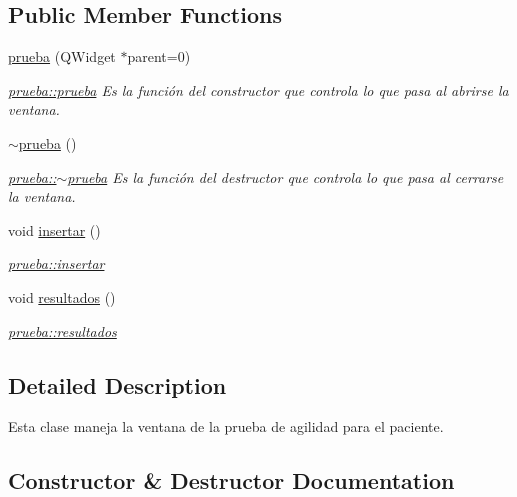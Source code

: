 \subsection*{Public Member Functions}
\begin{DoxyCompactItemize}
\item 
\hyperlink{classprueba_a24f54c7bdd250ae7c191204b6640e76a}{prueba} (Q\+Widget $\ast$parent=0)
\begin{DoxyCompactList}\small\item\em \hyperlink{classprueba_a24f54c7bdd250ae7c191204b6640e76a}{prueba\+::prueba} Es la función del constructor que controla lo que pasa al abrirse la ventana. \end{DoxyCompactList}\item 
\hyperlink{classprueba_a10ec83347646102027f40a34f8cc9688}{$\sim$prueba} ()
\begin{DoxyCompactList}\small\item\em \hyperlink{classprueba_a10ec83347646102027f40a34f8cc9688}{prueba\+::$\sim$prueba} Es la función del destructor que controla lo que pasa al cerrarse la ventana. \end{DoxyCompactList}\item 
void \hyperlink{classprueba_ac7bf490420a1bd8080157ce2e2d6b78c}{insertar} ()
\begin{DoxyCompactList}\small\item\em \hyperlink{classprueba_ac7bf490420a1bd8080157ce2e2d6b78c}{prueba\+::insertar} \end{DoxyCompactList}\item 
void \hyperlink{classprueba_ad26285fa9b7055591708f9a31223353b}{resultados} ()
\begin{DoxyCompactList}\small\item\em \hyperlink{classprueba_ad26285fa9b7055591708f9a31223353b}{prueba\+::resultados} \end{DoxyCompactList}\end{DoxyCompactItemize}


\subsection{Detailed Description}
Esta clase maneja la ventana de la prueba de agilidad para el paciente. 

\subsection{Constructor \& Destructor Documentation}
\mbox{\label{classprueba_a24f54c7bdd250ae7c191204b6640e76a}} 
